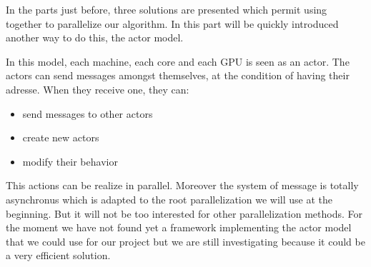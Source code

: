 In the parts just before, three solutions are presented which permit using together to parallelize our algorithm. In this part will be quickly introduced another way to do this, the actor model.

In this model, each machine, each core and each GPU is seen as an actor. The actors can send messages amongst themselves, at the condition of having their adresse. When they receive one, they can:
\begin{itemize}
\item send messages to other actors
\item create new actors
\item modify their behavior
\end{itemize}

This actions can be realize in parallel. Moreover the system of message is totally asynchronus which is adapted to the root parallelization we will use at the beginning. But it will not be too interested for other parallelization methods. For the moment we have not found yet a framework implementing the actor model that we could use for our project but we are still investigating because it could be a very efficient solution. 